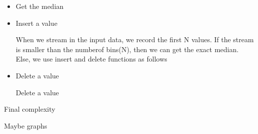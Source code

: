\begin{itemize}
  \item Get the median



  \item Insert a value

  When we stream in the input data, we record the first N values. If the stream is smaller than the numberof bins(N), then we can get the exact median. Else, we use insert and delete functions as follows

  \item Delete a value

  Delete a value

\end{itemize}







Final complexity

Maybe graphs


